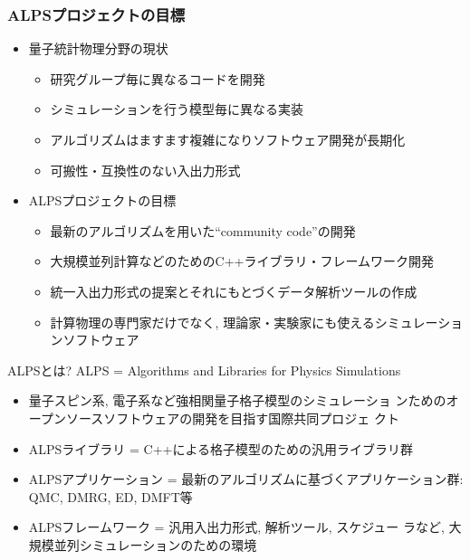 \begin{frame}
  \frametitle{ALPSプロジェクトの目標}
  \begin{itemize}
    \setlength{\itemsep}{1em}
  \item 量子統計物理分野の現状
    \begin{itemize}
    \item 研究グループ毎に異なるコードを開発
    \item シミュレーションを行う模型毎に異なる実装
    \item アルゴリズムはますます複雑になりソフトウェア開発が長期化
    \item 可搬性・互換性のない入出力形式
    \end{itemize}
  \item ALPSプロジェクトの目標
    \begin{itemize}
    \item 最新のアルゴリズムを用いた``community code''の開発
    \item 大規模並列計算などのためのC++ライブラリ・フレームワーク開発
    \item 統一入出力形式の提案とそれにもとづくデータ解析ツールの作成
    \item 計算物理の専門家だけでなく, 理論家・実験家にも使えるシミュレーションソフトウェア
    \end{itemize}
  \end{itemize}
\end{frame}

\begin{frame}{ALPSとは?}
  ALPS = \alert{A}lgorithms and \alert{L}ibraries for \alert{P}hysics \alert{S}imulations
      \begin{itemize}
      \item 量子スピン系, 電子系など強相関量子格子模型のシミュレーショ
        ンためのオープンソースソフトウェアの開発を目指す国際共同プロジェ
        クト
        \item ALPSライブラリ = C++による格子模型のための汎用ライブラリ群
        \item ALPSアプリケーション = 最新のアルゴリズムに基づくアプリケーション群: QMC, DMRG, ED, DMFT等
        \item ALPSフレームワーク = 汎用入出力形式, 解析ツール, スケジュー
          ラなど, 大規模並列シミュレーションのための環境
      \end{itemize}
\end{frame}

